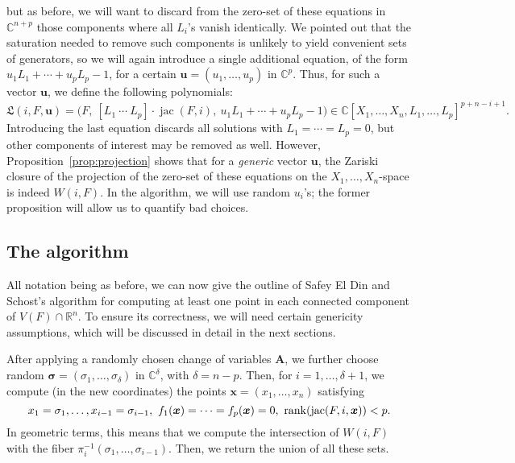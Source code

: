 \documentclass[12pt]{article}
\def\frkL{\mathfrak{L}}
\def\mA{{\bm A}}
\def\ub{{\bm u}}
\def\xb{{\bm x}}
\DeclareMathOperator{\jac}{jac}
\def\C{\mathbb{C}}
\def\R{\mathbb{R}}
\begin{document}
but as before, we will want to discard from the zero-set of these
equations in $\C^{n+p}$ those components where all $L_i$'s vanish
identically. We pointed out that the saturation needed to remove such components
is unlikely to yield convenient sets of generators, so we will again
introduce a single additional equation, of the form $u_1 L_1 + \cdots
+ u_p L_p -1$, for a certain $\bm u = (u_1,\dots,u_p)$ in
$\C^p$. Thus, for such a vector $\ub$, we define the following
polynomials:
\begin{equation}\label{eqdef:Iil}
\frkL(i,F,\bm u)= 
\big (F,\ [L_1~\cdots~L_p]\cdot \jac(F, i),\ u_1 L_1 + \cdots + u_p L_p -1 \big )
\in \C[X_1,\dots,X_n,L_1,\dots,L_p]^{p+n-i+1}.
\end{equation}
Introducing the last equation discards all solutions with $L_1 =
\cdots = L_p =0$, but other components of interest may be removed as
well. However, Proposition~\ref{prop:projection} shows that for a {\em
  generic} vector $\bm u$, the Zariski closure of the projection of
the zero-set of these equations on the $X_1,\dots,X_n$-space is indeed
$W(i,F)$.  In the algorithm, we will use random $u_i$'s; the former
proposition will allow us to quantify bad choices.


\subsection{The algorithm}\label{ssec:algo}

All notation being as before, we can now give the outline of Safey El
Din and Schost's algorithm for computing at least one point in each
connected component of $V(F) \cap\R^n$. To ensure its correctness, we
will need certain genericity assumptions, which will be discussed in
detail in the next sections.

After applying a randomly chosen change of variables $\mA$, we further
choose random $\bm\sigma=(\sigma_1,\dots,\sigma_{\delta})$ in
$\C^{\delta}$, with $\delta = n -p$. Then, for $i=1,\dots,\delta+1$,
we compute (in the new coordinates) the points $\xb=(x_1,\dots,x_n)$
satisfying
\begin{equation}\label{eq:syst}
x_1 = \sigma_1,\hdots,x_{i-1} = \sigma_{i-1},\ f_1(\xb)=\cdots=f_p(\xb)=0,\ {\rm rank} (\jac(F, i,\xb)) < p.
\end{equation}
In geometric terms, this means that we compute the intersection of
$W(i,F)$ with the fiber $\pi_i^{-1}(\sigma_1,\dots,\sigma_{i-1})$.
Then, we return the union of all these sets.
\end{document}
